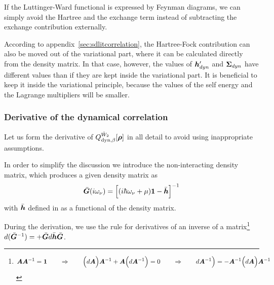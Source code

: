 \documentclass[11pt,a4paper]{report}
\begin{document}
If the Luttinger-Ward functional is expressed by Feynman diagrams, we
can simply avoid the Hartree and the exchange term instead of
subtracting the exchange contribution externally. 

According to appendix~\ref{sec:sdlitcorrelation}, the Hartree-Fock
contribution can also be moved out of the variational part, where it
can be calculated directly from the density matrix. In that case,
however, the values of $\bm{h}'_{dyn}$ and $\bm{\Sigma}_{dyn}$ have
different values than if they are kept inside the variational part. It
is beneficial to keep it inside the variational principle, because the
values of the self energy and the Lagrange multipliers will be
smaller.

\subsubsection{Derivative of the dynamical correlation}
Let us form the derivative of
$Q_{\text{dyn},\beta}^{\hat{W}_2}[\bm{\rho}]$ in all detail to avoid
using inappropriate assumptions.

In order to simplify the discussion we introduce the non-interacting
density matrix, which produces a given density matrix as
\begin{eqnarray}
\bar{\bm{G}}(i\omega_\nu)
=\Bigl[(i\hbar\omega_\nu+\mu)\bm{1}-\bar{\bm{h}}\Bigr]^{-1}
\label{eq:defgbar}
\end{eqnarray}
with $\bar{\bm{h}}$ defined in  as a functional of the
density matrix.

During the derivation, we use the rule for derivatives of an inverse of
a matrix\footnote{\begin{eqnarray} 
\bm{A}\bm{A}^{-1}=\bm{1}
\qquad\Rightarrow\qquad
\Bigl(d\bm{A}\Bigr)\bm{A}^{-1}
+\bm{A}\Bigl(d\bm{A}^{-1}\Bigr)=0
\qquad\Rightarrow\qquad
d\bm{A}^{-1}\Bigr)=-\bm{A}^{-1}\Bigl(d\bm{A}\Bigr)\bm{A}^{-1}
\end{eqnarray}
}
$d(\bar{\bm{G}}^{-1})=+\bar{\bm{G}}d\bar{\bm{h}}\bar{\bm{G}}$.
\end{document}
